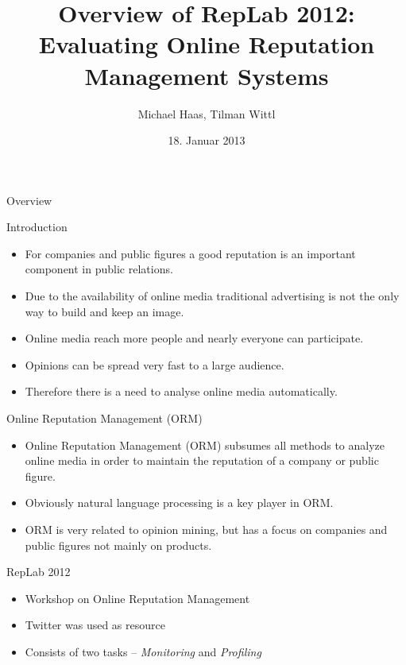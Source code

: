 \documentclass[12pt,a4paper]{beamer}
\author{Michael Haas, Tilman Wittl}
\title{Overview of RepLab 2012: Evaluating Online
Reputation Management Systems
}
\date{18. Januar 2013}
\begin{document}
\begin{frame}
\maketitle
\end{frame}

\begin{frame}{Overview}

\end{frame}

\begin{frame}{Introduction}
\begin{itemize}
\item For companies and public figures a good reputation is an important component in public relations.
\item Due to the availability of online media traditional advertising is not the only way to build and keep an image.
\item Online media reach more people and nearly everyone can participate.
\item Opinions can be spread very fast to a large audience.
\item Therefore there is a need to analyse online media automatically.
\end{itemize}
\end{frame}
\begin{frame}{Online Reputation Management (ORM)}
\begin{itemize}
\item Online Reputation Management (ORM) subsumes all methods to analyze online media in order to maintain the reputation of a company or public figure.
\item Obviously natural language processing is a key player in ORM.
\item ORM is very related to opinion mining, but has a focus on companies and public figures not mainly on products.
\end{itemize}
\end{frame}

\begin{frame}{RepLab 2012}
\begin{itemize}
\item Workshop on Online Reputation Management
\item Twitter was used as resource
\item Consists of two tasks -- \textit{Monitoring} and \textit{Profiling}
\end{itemize}
\end{frame}
\end{document}
